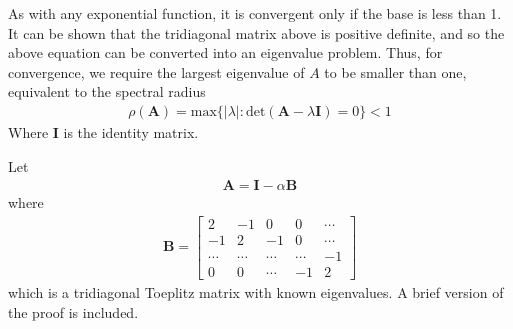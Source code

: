 \documentclass[twoside, 11pt]{article}
\begin{document}
			As with any exponential function, it is convergent only if the base is less than 1. It can be shown that the tridiagonal matrix above is positive definite, and so the above equation can be converted into an eigenvalue problem. Thus, for convergence, we require the largest eigenvalue of $A$ to be smaller than one, equivalent to the spectral radius
			\begin{align*}
				\rho(\mathbf{A}) = \mathrm{max}\{|\lambda|: \mathrm{det}(\mathbf{A}-\lambda\mathbf{I}) = 0\} < 1
			\end{align*}
			Where $\mathbf{I}$ is the identity matrix.
			
			Let 
			\begin{align*}
				\mathbf{A} = \mathbf{I} - \alpha\mathbf{B}
			\end{align*}
			where
			\begin{align*}
				\mathbf{B} = 
				\begin{bmatrix}
					2 & -1 & 0 & 0 & \cdots \\
					-1 & 2 & -1 & 0 & \cdots \\
					\cdots & \cdots & \cdots & \cdots & -1 \\
					 0 & 0 & \cdots & -1 & 2
				\end{bmatrix}
			\end{align*}
			which is a tridiagonal Toeplitz matrix with known eigenvalues\cite{pasquini2006tridiagonal}. A brief version of the proof is included.
			
\end{document}
